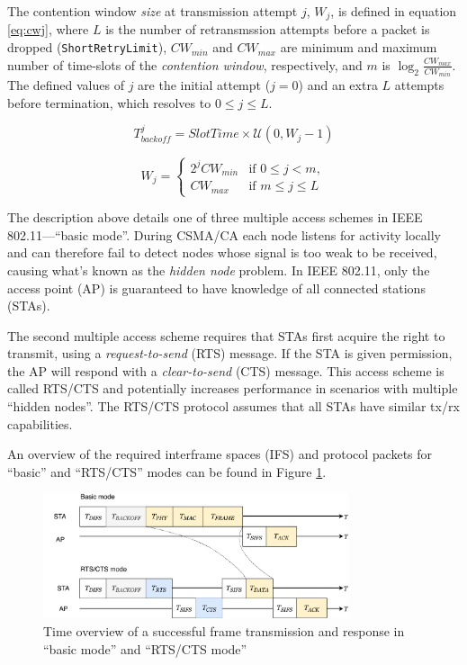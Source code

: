 The contention window \emph{size} at transmission attempt $j$, $W_{j}$, is
defined in equation \ref{eq:cwj}, where $L$ is the number of retransmssion
attempts before a packet is dropped (\texttt{ShortRetryLimit}),
$\mathit{CW}_{min}$ and $\mathit{CW}_{max}$ are minimum and maximum number of
time-slots of the \emph{contention window}, respectively, and $m$ is $\log_2
\frac{\mathit{CW}_{max}}{\mathit{CW}_{min}}$. The defined values of $j$ are
the initial attempt ($j=0$) and an extra $L$ attempts before termination,
which resolves to $0 \leq j \leq L$.

\begin{equation} \label{eq:tbackoff}
T^j_{\mathit{backoff}} = \mathit{SlotTime} \times \mathcal{U}(0,W_j-1)
\end{equation}

\begin{equation} \label{eq:cwj}
W_j = \left\{
    \begin{array}{ll}
        2^j \mathit{CW}_{min}  & \mbox{if } 0 \leq j < m, \\
        \mathit{CW}_{max}      & \mbox{if } m \leq j \leq L
    \end{array}
\right.
\end{equation}

The description above details one of three multiple access schemes in IEEE
802.11—``basic mode''. During CSMA/CA each node listens for activity locally
and can therefore fail to detect nodes whose signal is too weak to be
received, causing what's known as the \emph{hidden node} problem. In IEEE
802.11, only the access point (AP) is guaranteed to have knowledge of all
connected stations (STAs).

The second multiple access scheme requires that STAs first acquire the right
to transmit, using a \emph{request-to-send} (RTS) message. If the STA is given
permission, the AP will respond with a \emph{clear-to-send} (CTS) message.
This access scheme is called RTS/CTS and potentially increases performance in
scenarios with multiple ``hidden nodes''. The RTS/CTS protocol assumes that
all STAs  have similar tx/rx capabilities.

An overview of the required interframe spaces (IFS) and protocol packets for 
``basic'' and ``RTS/CTS'' modes can be found in Figure \ref{fig:timings}. 

\begin{figure}
\center
\includegraphics[width=0.8\textwidth]{images/time-overview.pdf}
\caption{Time overview of a successful frame transmission and response in ``basic mode'' and ``RTS/CTS mode''}
\label{fig:timings}
\end{figure}



